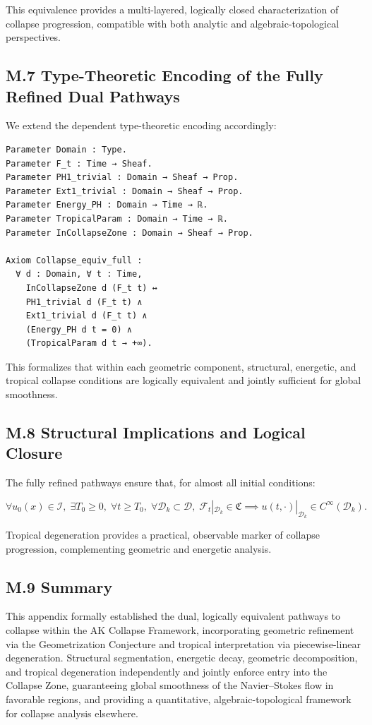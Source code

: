 \documentclass[11pt]{article}
\begin{document}
This equivalence provides a multi-layered, logically closed characterization of collapse progression, compatible with both analytic and algebraic-topological perspectives.

\subsection*{M.7 Type-Theoretic Encoding of the Fully Refined Dual Pathways}

We extend the dependent type-theoretic encoding accordingly:

\begin{lstlisting}[language=Coq]
Parameter Domain : Type.
Parameter F_t : Time → Sheaf.
Parameter PH1_trivial : Domain → Sheaf → Prop.
Parameter Ext1_trivial : Domain → Sheaf → Prop.
Parameter Energy_PH : Domain → Time → ℝ.
Parameter TropicalParam : Domain → Time → ℝ.
Parameter InCollapseZone : Domain → Sheaf → Prop.

Axiom Collapse_equiv_full :
  ∀ d : Domain, ∀ t : Time,
    InCollapseZone d (F_t t) ↔
    PH1_trivial d (F_t t) ∧
    Ext1_trivial d (F_t t) ∧
    (Energy_PH d t = 0) ∧
    (TropicalParam d t → +∞).
\end{lstlisting}

This formalizes that within each geometric component, structural, energetic, and tropical collapse conditions are logically equivalent and jointly sufficient for global smoothness.

\subsection*{M.8 Structural Implications and Logical Closure}

The fully refined pathways ensure that, for almost all initial conditions:

\[
\forall u_0(x) \in \mathcal{I},\; \exists T_0 \geq 0,\; \forall t \geq T_0,\; \forall \mathcal{D}_k \subset \mathcal{D},\;
\mathcal{F}_t|_{\mathcal{D}_k} \in \mathfrak{C} \implies u(t, \cdot)|_{\mathcal{D}_k} \in C^\infty(\mathcal{D}_k).
\]

Tropical degeneration provides a practical, observable marker of collapse progression, complementing geometric and energetic analysis.

\subsection*{M.9 Summary}

This appendix formally established the dual, logically equivalent pathways to collapse within the AK Collapse Framework, incorporating geometric refinement via the Geometrization Conjecture and tropical interpretation via piecewise-linear degeneration.  
Structural segmentation, energetic decay, geometric decomposition, and tropical degeneration independently and jointly enforce entry into the Collapse Zone, guaranteeing global smoothness of the Navier--Stokes flow in favorable regions, and providing a quantitative, algebraic-topological framework for collapse analysis elsewhere.
\end{document}
